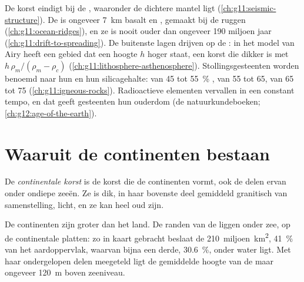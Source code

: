 \begin{recall}
De korst eindigt bij de , waaronder de dichtere mantel ligt
(\cref{ch:g11:seismic-structure}). De  is ongeveer \qty{7}{km}
basalt en , gemaakt bij de ruggen (\cref{ch:g11:ocean-ridges}), en ze is
nooit ouder dan ongeveer 190 miljoen jaar (\cref{ch:g11:drift-to-spreading}).
De buitenste lagen drijven op de : in het model van Airy heeft een gebied dat
een hoogte $h$ hoger staat, een korst die dikker is met $h\,\rho_m/(\rho_m -
\rho_c)$ (\cref{ch:g11:lithosphere-asthenosphere}). Stollingsgesteenten worden benoemd
naar hun  en hun silicagehalte:  van 45 tot
\qty{55}{\percent} ,  van 55 tot 65,  van 65 tot
75 (\cref{ch:g11:igneous-rocks}). Radioactieve elementen vervallen in een constant
tempo, en dat geeft gesteenten hun ouderdom (de natuurkundeboeken;
\cref{ch:g12:age-of-the-earth}).
\end{recall}

\section{Waaruit de continenten bestaan}

\begin{definition}\label{def:g12:continental-crust:continental-crust}
De \emph{continentale korst} is de korst die
de continenten vormt, ook de delen ervan onder ondiepe zeeën. Ze is
dik, in haar bovenste deel gemiddeld granitisch van samenstelling, licht, en ze
kan heel oud zijn.
\end{definition}

De continenten zijn groter dan het land. De randen van de 
liggen onder zee, op de continentale platten: zo in kaart gebracht beslaat de
 \num{210}~miljoen~\unit{km^2}, \qty{41}{\percent} van het
aardoppervlak, waarvan bijna een derde, \qty{30.6}{\percent},
onder water ligt. Met haar ondergelopen delen meegeteld ligt de gemiddelde hoogte van de
 maar ongeveer \qty{120}{m} boven zeeniveau.

